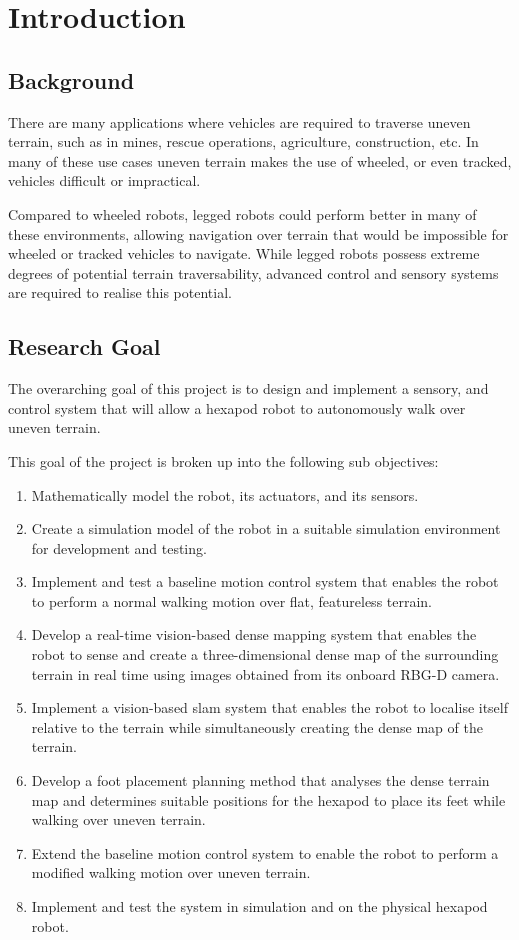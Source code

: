 \chapter{Introduction}

\section{Background}

    There are many applications where vehicles are required to traverse uneven terrain, such as in mines, rescue operations, agriculture, construction, etc. In many of these
    use cases uneven terrain makes the use of wheeled, or even tracked, vehicles difficult or impractical.

    Compared to wheeled robots, legged robots could perform better in many of these environments, allowing navigation over terrain that would be impossible for wheeled or
    tracked vehicles to navigate. While legged robots possess extreme degrees of potential terrain traversability, advanced control and sensory systems are required to 
    realise this potential.


\section{Research Goal}
    The overarching goal of this project is to design and implement a sensory, and control system that will allow a hexapod robot to autonomously walk over uneven terrain.

    This goal of the project is broken up into the following sub objectives:

    \begin{enumerate}
        \item Mathematically model the robot, its actuators, and its sensors.
        \item Create a simulation model of the robot in a suitable simulation environment for development and testing.
        \item Implement and test a baseline motion control system that enables the robot to
        perform a normal walking motion over flat, featureless terrain.
        \item Develop a real-time vision-based dense mapping system that enables the robot to sense and create a three-dimensional 
        dense map of the surrounding terrain in real time using images obtained from its onboard RBG-D camera.
        \item Implement a vision-based \ac{slam} system that enables the robot to localise itself relative to the terrain
        while simultaneously creating the dense map of the terrain.
        \item Develop a foot placement planning method that analyses the dense terrain map and determines suitable positions
        for the hexapod to place its feet while walking over uneven terrain.
        \item Extend the baseline motion control system to enable the robot to perform a modified walking motion over uneven terrain.
        \item Implement and test the system in simulation and on the physical hexapod robot.
    \end{enumerate}


